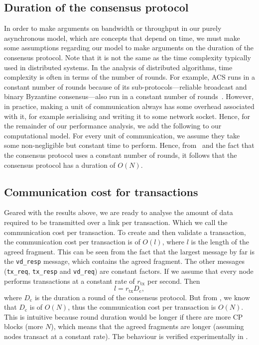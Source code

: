 \subsection{Duration of the consensus protocol}
\label{sec:cons-duration}
In order to make arguments on bandwidth or throughput in our purely asynchronous model, which are concepts that depend on time,
we must make some assumptions regarding our model to make arguments on the duration of the consensus protocol.
Note that it is not the same as the time complexity typically used in distributed systems.
In the analysis of distributed algorithms, time complexity is often in terms of the number of rounds.
For example, ACS runs in a constant number of rounds because of its sub-protocols---reliable broadcast and binary Byzantine consensus---also run in a constant number of rounds~\cite{miller2016honey}.
However, in practice, making a unit of communication always has some overhead associated with it, for example serialising and writing it to some network socket.
Hence, for the remainder of our performance analysis, we add the following to our computational model.
For every unit of communication, we assume they take some non-negligible but constant time to perform.
Hence, from~ and the fact that the consensus protocol uses a constant number of rounds,
it follows that the consensus protocol has a duration of $O(N)$.

\subsection{Communication cost for transactions}
\label{sec:communication-cost-for-tx}
Geared with the results above,
we are ready to analyse the amount of data required to be transmitted over a link per transaction.
Which we call the communication cost per transaction.
To create and then validate a transaction,
the communication cost per transaction is of $O(l)$,
where $l$ is the length of the agreed fragment.
This can be seen from the fact that the largest message by far is the \texttt{vd\_resp} message,
which contains the agreed fragment.
The other messages (\texttt{tx\_req}, \texttt{tx\_resp} and \texttt{vd\_req}) are constant factors.
If we assume that every node performs transactions at a constant rate of $r_{\text{tx}}$ per second.
Then
$$l = r_{\text{tx}} D_{\text{c}},$$
where $D_{\text{c}}$ is the duration a round of the consensus protocol.
But from ,
we know that $D_{\text{c}}$ is of $O(N)$, thus the communication cost per transaction is $O(N)$.
This is intuitive because round duration would be longer if there are more CP blocks (more $N$), which means that the agreed fragments are longer (assuming nodes transact at a constant rate).
The behaviour is verified experimentally in .

